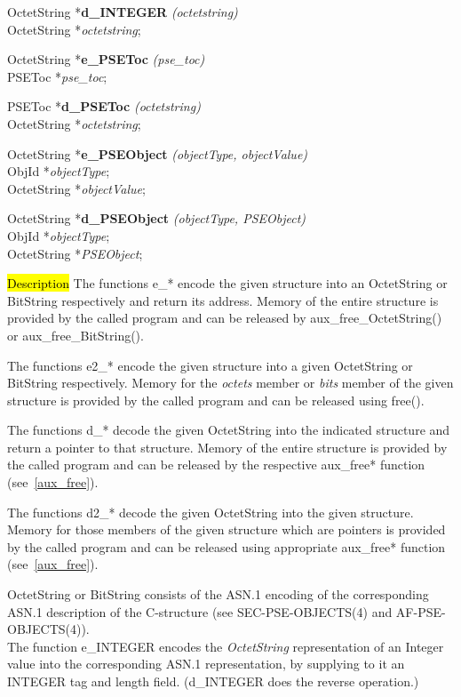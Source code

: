 OctetString *{\bf d\_INTEGER} {\em (octetstring)} \\
OctetString *{\em octetstring};

OctetString *{\bf e\_PSEToc} {\em (pse\_toc)} \\
PSEToc *{\em pse\_toc}; 

PSEToc *{\bf d\_PSEToc} {\em (octetstring)} \\
OctetString *{\em octetstring}; 

OctetString *{\bf e\_PSEObject} {\em (objectType, objectValue)} \\
ObjId *{\em objectType}; \\
OctetString *{\em objectValue}; 

OctetString *{\bf d\_PSEObject} {\em (objectType, PSEObject)} \\
ObjId *{\em objectType}; \\
OctetString *{\em PSEObject}; 

\hl{Description}     
The functions e\_* encode the given structure into an OctetString or BitString
respectively and return its address. Memory of the entire structure is provided 
by the called program and can be released
by aux\_free\_OctetString() or aux\_free\_BitString(). 

The functions e2\_* encode the given structure into a given OctetString or BitString
respectively. Memory for the {\em octets} member or {\em bits} member of the given structure
is provided by the called program and can be released
using  free(). 

The functions d\_* decode the given OctetString into the indicated structure and return
a pointer to that structure. Memory of the entire structure is provided 
by the called program and can be released by the respective aux\_free* function (see~\ref{aux_free}).

The functions d2\_* decode the given OctetString into the given structure.
Memory for those members of the given structure which are pointers is provided 
by the called program and can be released using appropriate aux\_free* function (see~\ref{aux_free}).

OctetString or BitString consists of the ASN.1 encoding of the corresponding ASN.1 description of the C-structure (see SEC-PSE-OBJECTS(4) and AF-PSE-OBJECTS(4)). 
\\ [1em]
The function e\_INTEGER encodes the {\em OctetString} representation of an Integer value into
the corresponding ASN.1 representation, by supplying to it an INTEGER tag and length field. 
(d\_INTEGER does the reverse operation.)

